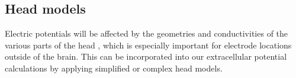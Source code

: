 \documentclass[preprint,10pt,authoryear]{elsarticle}
\begin{document}
%
%
%
%
%
%
%
%
%


\subsection{Head models}
Electric potentials will be affected by the geometries and conductivities of the various parts of the head \citep{NUNEZ2006}, which is especially important for electrode locations outside of the brain. This can be incorporated into our extracellular potential calculations by applying simplified or complex head models.
\end{document}
